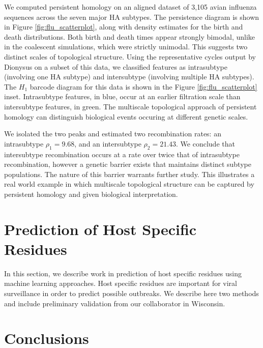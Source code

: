 We computed persistent homology on an aligned dataset of 3,105 avian influenza sequences across the seven major HA subtypes.
The persistence diagram is shown in Figure \ref{fig:flu_scatterplot}, along with density estimates for the birth and death distributions.
Both birth and death times appear strongly bimodal, unlike in the coalescent simulations, which were strictly unimodal.
This suggests two distinct scales of topological structure.
Using the representative cycles output by Dionysus on a subset of this data, we classified features as intrasubtype (involving one HA subtype) and intersubtype (involving multiple HA subtypes).
The $H_1$ barcode diagram for this data is shown in the Figure \ref{fig:flu_scatterplot} inset.
Intrasubtype features, in blue, occur at an earlier filtration scale than intersubtype features, in green.
The multiscale topological approach of persistent homology can distinguish biological events occuring at different genetic scales.

We isolated the two peaks and estimated two recombination rates: an intrasubtype $\rho_{1}=9.68$, and an intersubtype $\rho_{2}=21.43$.
We conclude that intersubtype recombination occurs at a rate over twice that of intrasubtype recombination, however a genetic barrier exists that maintains distinct subtype populations.
The nature of this barrier warrants further study.
This illustrates a real world example in which multiscale topological structure can be captured by persistent homology and given biological interpretation.

\section{Prediction of Host Specific Residues}
\label{sec:flu_flumarker}

In this section, we describe work in prediction of host specific residues using machine learning approaches.
Host specific residues are important for viral surveillance in order to predict possible outbreaks.
We describe here two methods and include preliminary validation from our collaborator in Wisconsin.

\section{Conclusions}
\label{sec:flu_conclusions}